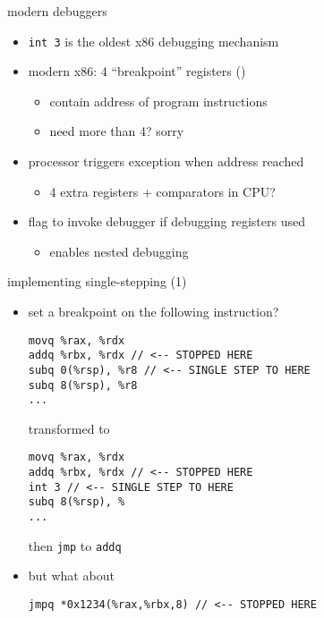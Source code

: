 \begin{frame}{modern debuggers}
    \begin{itemize}
    \item {\tt int 3} is the oldest x86 debugging mechanism
    \item modern x86: 4 ``breakpoint'' registers ()
        \begin{itemize}
        \item contain address of program instructions
        \item need more than 4? sorry
        \end{itemize}
    \item processor triggers exception when address reached
        \begin{itemize}
        \item 4 extra registers + comparators in CPU?
        \end{itemize}
    \item flag to invoke debugger if debugging registers used
        \begin{itemize}
        \item enables nested debugging
        \end{itemize}
    \end{itemize}
\end{frame}



\begin{frame}[fragile,label=implSingleStep]{implementing single-stepping (1)}
\lstset{language=myasm,style=small}
    \begin{itemize}
    \item set a breakpoint on the following instruction?
\begin{lstlisting}
movq %rax, %rdx
addq %rbx, %rdx // <-- STOPPED HERE
subq 0(%rsp), %r8 // <-- SINGLE STEP TO HERE
subq 8(%rsp), %r8
...
\end{lstlisting}
transformed to
\begin{lstlisting}
movq %rax, %rdx
addq %rbx, %rdx // <-- STOPPED HERE
int 3 // <-- SINGLE STEP TO HERE
subq 8(%rsp), %
...
\end{lstlisting}
then {\tt jmp} to {\tt addq}
    \item<2> but what about
\begin{lstlisting}
jmpq *0x1234(%rax,%rbx,8) // <-- STOPPED HERE
\end{lstlisting}
\end{itemize}
\end{frame}

